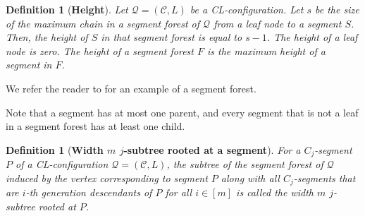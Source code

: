 \documentclass{article}
\newtheorem{definition}[theorem]{Definition}
\numberwithin{claimcounter}{lemma}
\begin{document}
\begin{definition}[\bf{Height}]
    Let $\mathcal{Q}=(\mathcal{C},L)$ be a CL-configuration. Let $s$ be the size of the maximum chain in a \emph{segment forest} of $\mathcal{Q}$ from  a leaf node to a segment $S$. 
    Then, the \emph{height of $S$} in that segment forest is equal to $s-1$. The height of a leaf node is zero. The height of a segment forest $F$ is the maximum height of a segment in $F$.
\end{definition}

We refer the reader to  for an example of a segment forest.

Note that a segment has at most one parent, and every segment that is not a leaf in a segment forest has at least one child.

\begin{definition}[\bf{Width $m$ $j$-subtree rooted at a segment}]
    For a $C_j$-segment $P$ of  a  CL-configuration $\mathcal{Q}=(\mathcal{C},L)$, the subtree  of the \emph{segment forest}  of $\mathcal{Q}$  induced by the vertex corresponding to segment $P$ along with all $C_j$-segments that are $i$-th generation descendants of $P$ for all $i \in [m]$ is called the \emph{width $m$ $j$-subtree rooted at $P$}. 
\end{definition}
\end{document}
